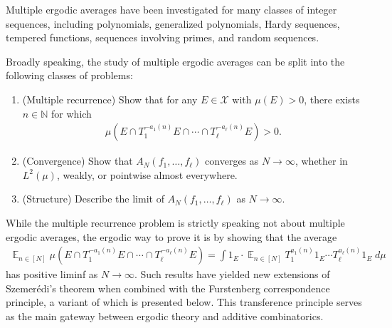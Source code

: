 \documentclass[11pt]{amsart}
\theoremstyle{definition}
\DeclareMathOperator*{\E}{\mathbb{E}}
\newcommand{\N}{{\mathbb N}}
\newcommand{\Z}{{\mathbb Z}}
\newcommand{\CX}{{\mathcal X}}
\newcommand{\1}{{\mathbf{1}}}
\begin{document}
Multiple ergodic averages have been investigated for many classes of integer sequences, including polynomials, generalized polynomials, Hardy sequences, tempered functions, sequences involving primes, and random sequences. %

Broadly speaking, the 
study of multiple ergodic averages can be split into the following classes of problems:
\begin{enumerate}
\item (Multiple recurrence) Show that for any $E\in\CX$ with $\mu(E)>0$, there exists $n\in\N$ for which
\begin{align*}
\mu(E\cap T_1^{-a_1(n)}E\cap\cdots\cap T_\ell^{-a_\ell(n)}E) >0.
\end{align*}
\item (Convergence) Show that $A_N(f_1, \ldots, f_\ell)$ converges as $N\to\infty$, whether in $L^2(\mu)$, weakly, or pointwise almost everywhere.
\item (Structure) Describe the limit of $A_N(f_1, \ldots, f_\ell)$ as $N\to\infty$.
\end{enumerate}
While the multiple recurrence problem is strictly speaking not about multiple ergodic averages, the ergodic way to prove it is by showing that the average
\begin{align*}
\E_{n\in[N]} \mu(E\cap T_1^{-a_1(n)}E\cap\cdots\cap T_\ell^{-a_\ell(n)}E) = \int 1_E \cdot \E_{n\in[N]} T_1^{a_1(n)}1_E \cdots T_\ell^{a_\ell(n)}1_E\; d\mu
\end{align*}
has positive liminf as $N\to\infty$. Such results have yielded new extensions of Szemer\'edi's theorem when combined with the Furstenberg correspondence principle, a variant of which is presented below. This transference principle serves as the main gateway between ergodic theory and additive combinatorics.
\end{document}
